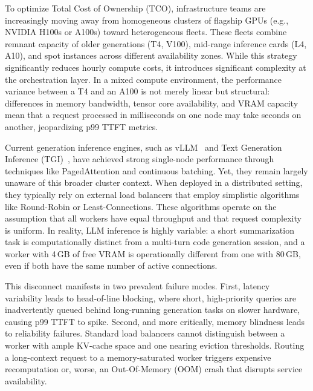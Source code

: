 \documentclass[10pt,twocolumn,letterpaper]{article}
\begin{document}
To optimize Total Cost of Ownership (TCO), infrastructure teams are increasingly moving away from homogeneous clusters of flagship GPUs (e.g., NVIDIA H100s or A100s) toward heterogeneous fleets. These fleets combine remnant capacity of older generations (T4, V100), mid-range inference cards (L4, A10), and spot instances across different availability zones. While this strategy significantly reduces hourly compute costs, it introduces significant complexity at the orchestration layer. In a mixed compute environment, the performance variance between a T4 and an A100 is not merely linear but structural: differences in memory bandwidth, tensor core availability, and VRAM capacity mean that a request processed in milliseconds on one node may take seconds on another, jeopardizing p99 TTFT metrics.

Current generation inference engines, such as vLLM~\cite{vllm} and Text Generation Inference (TGI)~\cite{tgi}, have achieved strong single-node performance through techniques like PagedAttention and continuous batching. Yet, they remain largely unaware of this broader cluster context. When deployed in a distributed setting, they typically rely on external load balancers that employ simplistic algorithms like Round-Robin or Least-Connections. These algorithms operate on the assumption that all workers have equal throughput and that request complexity is uniform. In reality, LLM inference is highly variable: a short summarization task is computationally distinct from a multi-turn code generation session, and a worker with 4\,GB of free VRAM is operationally different from one with 80\,GB, even if both have the same number of active connections.

This disconnect manifests in two prevalent failure modes. First, latency variability leads to head-of-line blocking, where short, high-priority queries are inadvertently queued behind long-running generation tasks on slower hardware, causing p99 TTFT to spike. Second, and more critically, memory blindness leads to reliability failures. Standard load balancers cannot distinguish between a worker with ample KV-cache space and one nearing eviction thresholds. Routing a long-context request to a memory-saturated worker triggers expensive recomputation or, worse, an Out-Of-Memory (OOM) crash that disrupts service availability.
\end{document}
